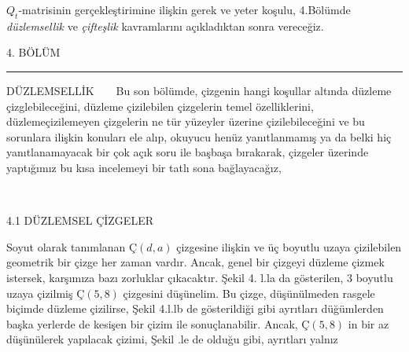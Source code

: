 \documentclass[11pt]{amsbook}
\begin{document}
$Q_t$-matrisinin gerçekleştirimine ilişkin gerek ve
\newline
yeter koşulu, 4.Bölümde \textit{düzlemsellik} ve \textit{çifteşlik}
\newline
kavramlarını açıkladıktan sonra vereceğiz.

\newpage
\normalsize

\newpage

\huge
4. BÖLÜM
\newline
\noindent\rule[0.5ex]{\linewidth}{1pt}
DÜZLEMSELLİK
~\newline
\LARGE
~\newline
Bu son bölümde, çizgenin hangi koşullar altında
\newline
düzleme çizglebileceğini, düzleme çizilebilen
\newline
çizgelerin temel özelliklerini, düzlemeçizilemeyen
\newline
çizgelerin ne tür yüzeyler üzerine çizilebileceğini
\newline
ve bu sorunlara ilişkin konuları ele alıp,
\newline
okuyucu henüz yanıtlanmamış ya da belki hiç
\newline
yanıtlanamayacak bir çok açık soru ile başbaşa
\newline
bırakarak, çizgeler üzerinde yaptığımız bu kısa
\newline
incelemeyi bir tatlı sona bağlayacağız,

~\newline

4.1 DÜZLEMSEL ÇİZGELER
~\newline

Soyut olarak tanımlanan $Ç(d,a)$ çizgesine ilişkin
\newline
ve üç boyutlu uzaya çizilebilen geometrik bir
\newline
çizge her zaman vardır. Ancak, genel bir çizgeyi
\newline
düzleme çizmek istersek, karşımıza bazı zorluklar
\newline
çıkacaktır. Şekil 4. l.la da gösterilen, 3 boyutlu
\newline
uzaya çizilmiş $Ç(5,8)$ çizgesini düşünelim. Bu
\newline
çizge, düşünülmeden rasgele biçimde düzleme
\newline
çizilirse, Şekil 4.l.lb de gösterildiği gibi
\newline
ayrıtları düğümlerden başka yerlerde de kesişen
\newline
bir çizim ile sonuçlanabilir. Ancak, $Ç(5,8)$ in
\newline
bir az düşünülerek yapılacak çizimi, Şekil
 .le de olduğu gibi, ayrıtları yalnız
\end{document}
